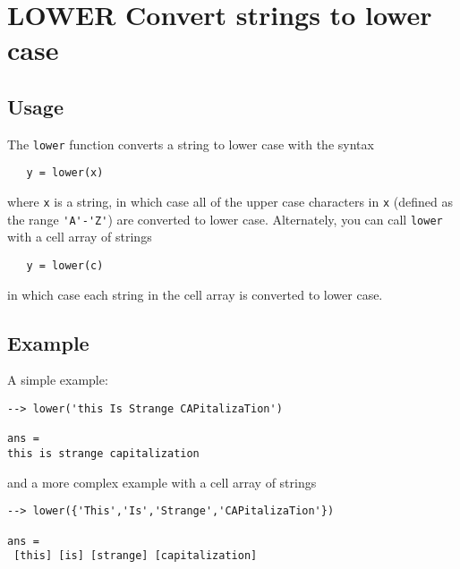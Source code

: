 \section{LOWER Convert strings to lower case}

\subsection{Usage}

The \verb|lower| function converts a string to lower case with
the syntax
\begin{verbatim}
   y = lower(x)
\end{verbatim}
where \verb|x| is a string, in which case all of the upper case
characters in \verb|x| (defined as the range \verb|'A'-'Z'|) are
converted to lower case.  Alternately, you can call \verb|lower|
with a cell array of strings
\begin{verbatim}
   y = lower(c)
\end{verbatim}
in which case each string in the cell array is converted to lower case.
\subsection{Example}

A simple example:
\begin{verbatim}
--> lower('this Is Strange CAPitalizaTion')

ans = 
this is strange capitalization
\end{verbatim}
and a more complex example with a cell array of strings
\begin{verbatim}
--> lower({'This','Is','Strange','CAPitalizaTion'})

ans = 
 [this] [is] [strange] [capitalization] 
\end{verbatim}
